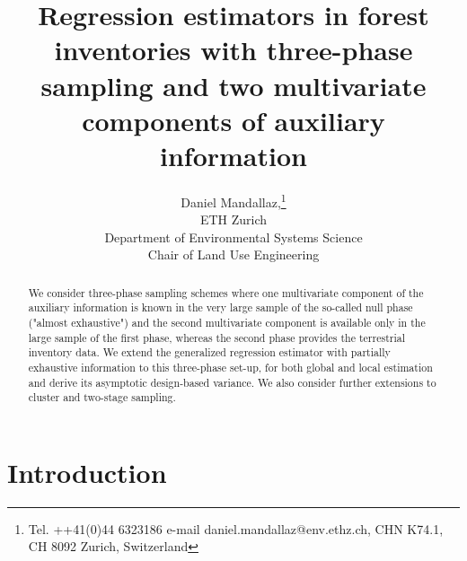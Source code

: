 \documentclass[a4paper,12pt,leqno, titlepage]{article}
\begin{document}
\doublespacing
\pagestyle{plain}

\title{Regression estimators in forest inventories with three-phase sampling and two multivariate components of auxiliary information}
\author{Daniel Mandallaz,\thanks{Tel. ++41(0)44 6323186 e-mail
    daniel.mandallaz@env.ethz.ch, CHN K74.1, CH 8092 Zurich, Switzerland} \\ETH Zurich\\ Department of Environmental Systems Science\\ Chair of Land Use Engineering}
\date{}

\maketitle
\newpage

\begin{abstract}
We consider three-phase sampling schemes where one multivariate component of the auxiliary information is known in the very large sample of the so-called null phase ("almost exhaustive") and the second multivariate component is available only in the large sample of the first phase, whereas the second phase provides the terrestrial inventory data. We extend the generalized regression estimator with partially exhaustive information to this three-phase set-up, for both global and local estimation and derive its asymptotic design-based variance. We also consider further extensions to cluster and two-stage sampling.
\end{abstract}
\clearpage


\section{Introduction}\label{introduction}
 \setcounter{page}{1}
\end{document}

